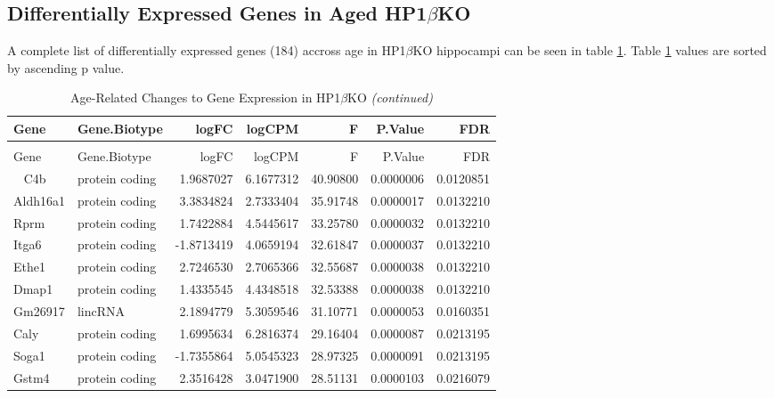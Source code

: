 \documentclass[onehalf,12pt]{beavtex}
\begin{document}
  \subsection{\texorpdfstring{Differentially Expressed Genes in Aged
  HP1\(\beta\)KO}{Differentially Expressed Genes in Aged HP1\textbackslash{}betaKO}}\label{differentially-expressed-genes-in-aged-hp1betako}
  
  A complete list of differentially expressed genes (184) accross age in
  HP1\(\beta\)KO hippocampi can be seen in table \ref{tab:BKOlongtable}.
  Table \ref{tab:BKOlongtable} values are sorted by ascending p value.
  
  \begingroup\fontsize{8}{10}\selectfont
  
  \begin{longtable}{llrrrrr}
  \caption{\label{tab:BKOlongtable}Age-Related Changes to Gene Expression in HP1$\beta$KO}\\
  \toprule
  Gene & Gene.Biotype & logFC & logCPM & F & P.Value & FDR\\
  \midrule
  \endfirsthead
  \caption[]{\label{tab:BKOlongtable}Age-Related Changes to Gene Expression in HP1$\beta$KO \textit{(continued)}}\\
  \toprule
  Gene & Gene.Biotype & logFC & logCPM & F & P.Value & FDR\\
  \midrule
  \endhead
  \
  \endfoot
  \bottomrule
  \endlastfoot
  C4b & protein coding & 1.9687027 & 6.1677312 & 40.90800 & 0.0000006 & 0.0120851\\
  Aldh16a1 & protein coding & 3.3834824 & 2.7333404 & 35.91748 & 0.0000017 & 0.0132210\\
  Rprm & protein coding & 1.7422884 & 4.5445617 & 33.25780 & 0.0000032 & 0.0132210\\
  Itga6 & protein coding & -1.8713419 & 4.0659194 & 32.61847 & 0.0000037 & 0.0132210\\
  Ethe1 & protein coding & 2.7246530 & 2.7065366 & 32.55687 & 0.0000038 & 0.0132210\\
  \addlinespace
  Dmap1 & protein coding & 1.4335545 & 4.4348518 & 32.53388 & 0.0000038 & 0.0132210\\
  Gm26917 & lincRNA & 2.1894779 & 5.3059546 & 31.10771 & 0.0000053 & 0.0160351\\
  Caly & protein coding & 1.6995634 & 6.2816374 & 29.16404 & 0.0000087 & 0.0213195\\
  Soga1 & protein coding & -1.7355864 & 5.0545323 & 28.97325 & 0.0000091 & 0.0213195\\
  Gstm4 & protein coding & 2.3516428 & 3.0471900 & 28.51131 & 0.0000103 & 0.0216079\\

\end{longtable}
\end{document}
